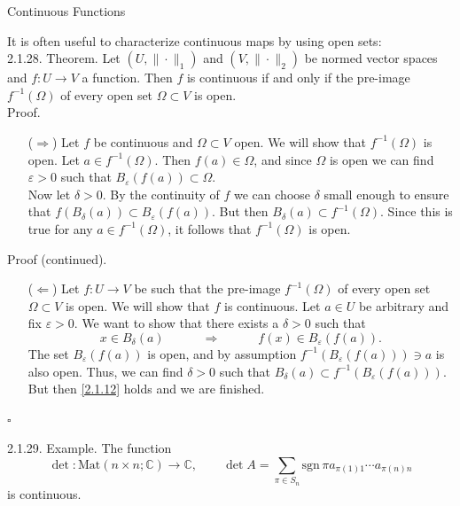 \documentclass[smaller,hyperref={CJKbookmarks=true}]{beamer}
\newcommand{\C}{\mathbb{C}} \newcommand{\F}{\mathbb{F}} \newcommand{\R}{\mathbb{R}} \newcommand{\Q}{\mathbb{Q}}
\begin{document}
\begin{frame}{Continuous Functions}
\begin{spacing}{1}
It is often useful to characterize continuous maps by using open sets:\\[4pt]
\alert{2.1.28. Theorem.} Let $(U,\|\cdot\|_1)$ and $(V,\|\cdot\|_2)$ be normed vector spaces and $f:U\to V$ a function. Then $f$ is continuous if and only if the pre-image $f^{-1}(\Omega)$ of every open set $\Omega\subset V$ is open.\\[6pt]
\alert{Proof.}
\begin{itemize}
  \item[($\Rightarrow$)] Let $f$ be continuous and $\Omega\subset V$ open. We will show that $f^{-1}(\Omega)$ is open. Let $a\in f^{-1}(\Omega)$. Then $f(a)\in\Omega$, and since $\Omega$ is open we can find $\varepsilon>0$ such that $B_{\varepsilon}(f(a))\subset\Omega$.\\[5pt]
      Now let $\delta>0$. By the continuity of $f$ we can choose $\delta$ small enough to ensure that $f(B_{\delta}(a))\subset B_{\varepsilon}(f(a)).$ But then $B_{\delta}(a)\subset f^{-1}(\Omega)$. Since this is true for any $a\in f^{-1}(\Omega)$, it follows that $f^{-1}(\Omega)$ is open.
\end{itemize}
\newpage
\alert{Proof (continued).}
\begin{itemize}
   \item[($\Leftarrow$)] Let $f:U\to V$ be such that the pre-image $f^{-1}(\Omega)$ of every open set $\Omega\subset V$ is open. We will show that $f$ is continuous. Let $a\in U$ be arbitrary and fix $\varepsilon>0$. We want to show that there exists a $\delta>0$ such that
       \begin{equation}\label{2.1.12}
         x\in B_{\delta}(a)\qquad\quad\Rightarrow\qquad\quad f(x)\in B_{\varepsilon}(f(a)).
       \end{equation}
       The set $B_{\varepsilon}(f(a))$ is open, and by assumption $f^{-1}(B_{\varepsilon}(f(a)))\ni a$ is also open. Thus, we can find $\delta>0$ such that $B_{\delta}(a)\subset f^{-1}(B_{\varepsilon}(f(a)))$. But then \eqref{2.1.12} holds and we are finished.
\end{itemize}
\begin{flushright}
  $\square$
\end{flushright}
\newpage
\alert{2.1.29. Example.} The function
\[\det:\text{Mat}(n\times n;\C)\to\C,\qquad\det A=\sum_{\pi\in S_n}\text{sgn}\,\pi a_{\pi(1)1}\cdots a_{\pi(n)n}\]
is continuous.\\

\end{spacing}
\end{frame}
\end{document}
